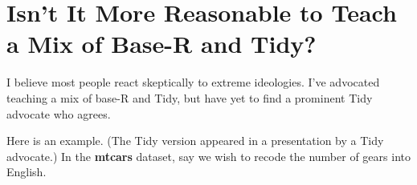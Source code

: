 \documentclass[11pt]{article}
\begin{document}
\begin{parcolumns}[rulebetween=true]{2}


\hspace{0.1in}


\end{parcolumns}

\section*{Isn't It More Reasonable to Teach a Mix of Base-R and Tidy?}

I believe most people react skeptically to extreme ideologies.  I've
advocated teaching a mix of base-R and Tidy, but have yet to find a
prominent Tidy advocate who agrees.

Here is an example.  (The Tidy version appeared in a presentation by a
Tidy advocate.)  In the \textbf{mtcars} dataset, say we wish to recode
the number of gears into English.
\end{document}
